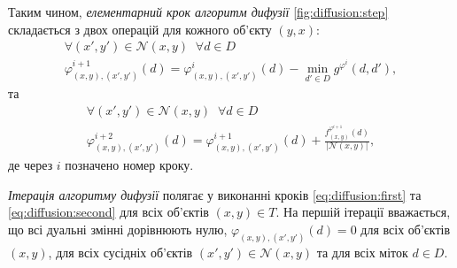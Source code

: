 Таким чином, \textit{елементарний крок алгоритм дифузії}
\ref{fig:diffusion:step}
складається з двох операцій для кожного об'єкту $\left(y, x \right)$:
\begin{equation}\label{eq:diffusion:first}
\begin{gathered}
    \forall \left( x', y' \right) \in \mathcal{N} \left(x, y\right) \; \;
    \forall d \in D \\
    \varphi_{\left(x, y \right), \left(x', y' \right)}^{i + 1} \left( d \right)
    = \varphi_{\left(x, y \right), \left(x', y' \right)}^i \left( d \right)
    - \min \limits_{d' \in D}
        g^{\varphi^i} \left(d, d' \right),
\end{gathered}
\end{equation}
та
\begin{equation}\label{eq:diffusion:second}
\begin{gathered}
    \forall \left( x', y' \right) \in \mathcal{N} \left(x, y\right) \; \;
    \forall d \in D \\
    \varphi_{\left(x, y \right), \left(x', y' \right)}^{i + 2} \left( d \right)
    = \varphi_{\left(x, y \right), \left(x', y' \right)}^{i + 1} \left( d \right)
    + \frac{f_{\left(x, y \right)}^{\varphi^{i + 1}} \left(d \right)}{\left| \mathcal{N} \left(x, y \right)\right|},
\end{gathered}
\end{equation}
де через $i$ позначено номер кроку.

\textit{Ітерація алгоритму дифузії}
полягає у виконанні кроків \eqref{eq:diffusion:first}
та \eqref{eq:diffusion:second} для всіх об'єктів $\left( x, y \right) \in T$.
На першій ітерації вважається, що всі дуальні змінні дорівнюють нулю,
$\varphi_{\left(x, y \right), \left(x', y' \right)} \left( d \right) = 0$
для всіх об'єктів $\left(x, y \right)$,
для всіх сусідніх об'єктів
$\left(x', y' \right) \in \mathcal{N} \left(x, y \right)$
та для всіх міток $d \in D$.

